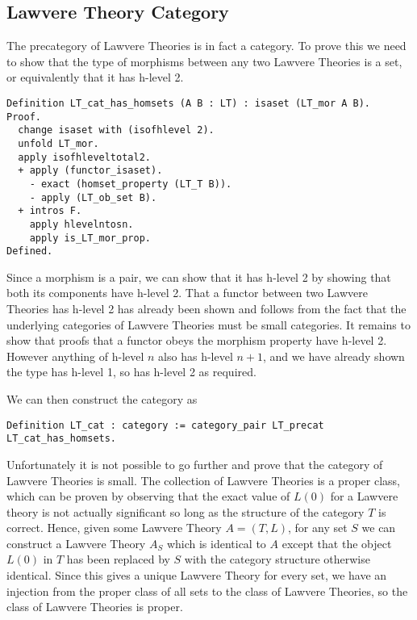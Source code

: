 \subsection{Lawvere Theory Category}
The precategory of Lawvere Theories is in fact a category. To prove this we need
to show that the type of morphisms between any two Lawvere Theories is a set, or
equivalently that it has h-level 2.
\begin{lstlisting}
Definition LT_cat_has_homsets (A B : LT) : isaset (LT_mor A B).
Proof.
  change isaset with (isofhlevel 2).
  unfold LT_mor.
  apply isofhleveltotal2.
  + apply (functor_isaset).
    - exact (homset_property (LT_T B)).
    - apply (LT_ob_set B).
  + intros F.
    apply hlevelntosn.
    apply is_LT_mor_prop.
Defined.
\end{lstlisting}
Since a morphism is a pair, we can show that it has h-level 2 by showing that
both its components have h-level 2. That a functor between two Lawvere Theories
has h-level 2 has already been shown and follows from the fact that the
underlying categories of Lawvere Theories must be small categories. It remains
to show that proofs that a functor obeys the morphism property have h-level 2.
However anything of h-level $n$ also has h-level $n+1$, and we have already
shown the type has h-level 1, so has h-level 2 as required.

We can then construct the category as
\begin{lstlisting}
Definition LT_cat : category := category_pair LT_precat LT_cat_has_homsets.
\end{lstlisting}

Unfortunately it is not possible to go further and prove that the category of
Lawvere Theories is small. The collection of Lawvere Theories is a proper class,
which can be proven by observing that the exact value of $L(0)$ for a Lawvere
theory is not actually significant so long as the structure of the category $T$
is correct. Hence, given some Lawvere Theory $A = (T, L)$, for any set $S$ we
can construct a Lawvere Theory $A_S$ which is identical to $A$ except that the
object $L(0)$ in $T$ has been replaced by $S$ with the category structure
otherwise identical. Since this gives a unique Lawvere Theory for every set, we
have an injection from the proper class of all sets to the class of Lawvere
Theories, so the class of Lawvere Theories is proper.